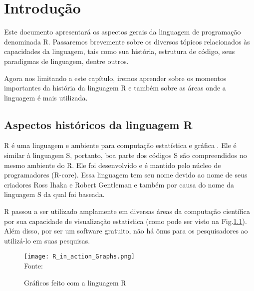 \chapter{ Introdução}
  Este documento apresentará os aspectos gerais da linguagem de programação denominada R. Passaremos brevemente sobre os diversos tópicos relacionados às capacidades da linguagem, tais como sua história, estrutura de código, seus paradigmas de linguagem, dentre outros.

  Agora nos limitando a este capítulo, iremos aprender sobre os momentos importantes da história da linguagem R e também sobre as áreas onde a linguagem é mais utilizada.

  \section{Aspectos históricos da linguagem R}

    R é uma linguagem e ambiente para computação estatística e gráfica \cite{Eglen2009}. Ele é similar à linguagem S, portanto, boa parte dos códigos S são compreendidos no mesmo ambiente do R. Ele foi desenvolvido e é mantido pelo núcleo de programadores (R-core). Essa linguagem tem seu nome devido ao nome de seus criadores Ross Ihaka e Robert Gentleman e também por causa do nome da linguagem S da qual foi baseada.

    R passou a ser utilizado amplamente em diversas áreas da computação científica por sua capacidade de visualização estatística (como pode ser visto na Fig.\ref{R_Graphs}). Além disso, por ser um software gratuito, não há ônus para os pesquisadores ao utilizá-lo em suas pesquisas.

    \begin{comment}
      https://rkabacoff.github.io/datavis/datavis.pdf
      https://web.stanford.edu/class/bios221/book/Chap-Graphics.html
      https://www.r-graph-gallery.com/index.html
      https://www.r-project.org/
    \end{comment}
    \begin{figure}[H]
      \begin{center}
        \caption{Gráficos feito com a linguagem R} \label{R_Graphs}
        \texttt{[image: R\_in\_action\_Graphs.png]} \\
        {\tiny \sf Fonte: \cite{Kabacoff2015}}
      \end{center}
    \end{figure}

